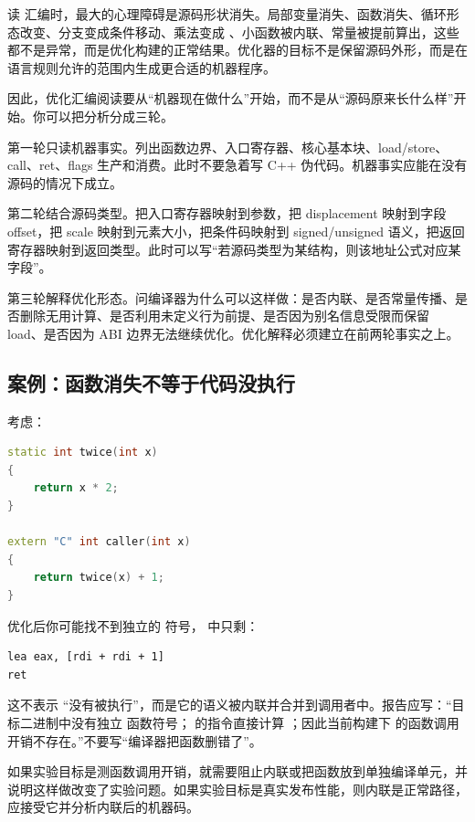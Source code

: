 读  汇编时，最大的心理障碍是源码形状消失。局部变量消失、函数消失、循环形态改变、分支变成条件移动、乘法变成 、小函数被内联、常量被提前算出，这些都不是异常，而是优化构建的正常结果。优化器的目标不是保留源码外形，而是在语言规则允许的范围内生成更合适的机器程序。

因此，优化汇编阅读要从“机器现在做什么”开始，而不是从“源码原来长什么样”开始。你可以把分析分成三轮。

第一轮只读机器事实。列出函数边界、入口寄存器、核心基本块、load/store、call、ret、flags 生产和消费。此时不要急着写 C++ 伪代码。机器事实应能在没有源码的情况下成立。

第二轮结合源码类型。把入口寄存器映射到参数，把 displacement 映射到字段 offset，把 scale 映射到元素大小，把条件码映射到 signed/unsigned 语义，把返回寄存器映射到返回类型。此时可以写“若源码类型为某结构，则该地址公式对应某字段”。

第三轮解释优化形态。问编译器为什么可以这样做：是否内联、是否常量传播、是否删除无用计算、是否利用未定义行为前提、是否因为别名信息受限而保留 load、是否因为 ABI 边界无法继续优化。优化解释必须建立在前两轮事实之上。

\subsection{案例：函数消失不等于代码没执行}

考虑：

\begin{lstlisting}[language=C++]
static int twice(int x)
{
    return x * 2;
}

extern "C" int caller(int x)
{
    return twice(x) + 1;
}
\end{lstlisting}

优化后你可能找不到独立的  符号， 中只剩：

\begin{lstlisting}
lea eax, [rdi + rdi + 1]
ret
\end{lstlisting}

这不表示  “没有被执行”，而是它的语义被内联并合并到调用者中。报告应写：“目标二进制中没有独立  函数符号； 的指令直接计算 ；因此当前构建下  的函数调用开销不存在。”不要写“编译器把函数删错了”。

如果实验目标是测函数调用开销，就需要阻止内联或把函数放到单独编译单元，并说明这样做改变了实验问题。如果实验目标是真实发布性能，则内联是正常路径，应接受它并分析内联后的机器码。

